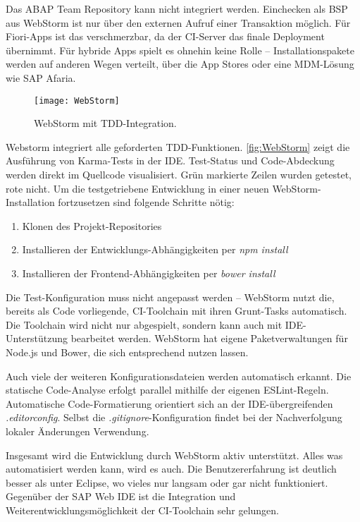 Das ABAP Team Repository kann nicht integriert werden. Einchecken als \ac{BSP} aus WebStorm ist nur über den externen Aufruf einer Transaktion möglich. Für Fiori-Apps ist das verschmerzbar, da der CI-Server das finale Deployment übernimmt. Für hybride Apps spielt es ohnehin keine Rolle -- Installationspakete werden auf anderen Wegen verteilt, \zB über die App Stores oder eine \ac{MDM}-Lösung wie SAP Afaria.

\begin{figure}[h]
	\centering
	\texttt{[image: WebStorm]} 
	\caption[WebStorm mit TDD-Integration]{WebStorm mit TDD-Integration.}
	\label{fig:WebStorm}
\end{figure}

Webstorm integriert alle geforderten \ac{TDD}-Funktionen. \autoref{fig:WebStorm} zeigt die Ausführung von Karma-Tests in der \ac{IDE}. Test-Status und Code-Abdeckung werden direkt im Quellcode visualisiert. Grün markierte Zeilen wurden getestet, rote nicht. Um die testgetriebene Entwicklung in einer neuen WebStorm-Installation fortzusetzen sind folgende Schritte nötig:
\begin{enumerate}
	\item Klonen des Projekt-Repositories
	\item Installieren der Entwicklungs-Abhängigkeiten per \emph{npm install}
	\item Installieren der Frontend-Abhängigkeiten per \emph{bower install}
\end{enumerate}
Die Test-Konfiguration muss nicht angepasst werden -- WebStorm nutzt die, bereits als Code vorliegende, CI-Toolchain mit ihren Grunt-Tasks automatisch. Die Toolchain wird nicht nur abgespielt, sondern kann auch mit IDE-Unterstützung bearbeitet werden. WebStorm hat eigene Paketverwaltungen für Node.js und Bower, die sich entsprechend nutzen lassen.

Auch viele der weiteren Konfigurationsdateien werden automatisch erkannt. Die statische Code-Analyse erfolgt parallel mithilfe der eigenen ESLint-Regeln. Automatische Code-Formatierung orientiert sich an der IDE-übergreifenden \emph{.editorconfig}. Selbst die \emph{.gitignore}-Konfiguration findet bei der Nachverfolgung lokaler Änderungen Verwendung.

Insgesamt wird die Entwicklung durch WebStorm aktiv unterstützt. Alles was automatisiert werden kann, wird es auch. Die Benutzererfahrung ist deutlich besser als unter Eclipse, wo vieles nur langsam oder gar nicht funktioniert. Gegenüber der SAP Web IDE ist die Integration und Weiterentwicklungsmöglichkeit der CI-Toolchain sehr gelungen.



